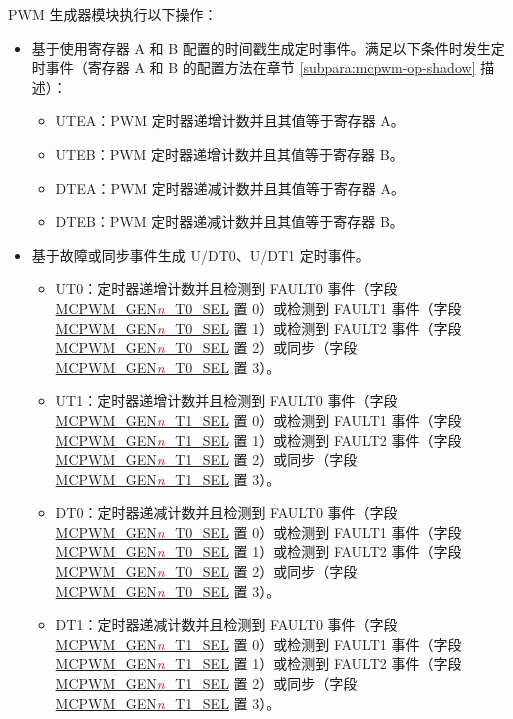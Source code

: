 \documentclass[main\_\_CN.tex]{subfiles}
\begin{document}
PWM 生成器模块执行以下操作：
\begin{itemize}
    \item 基于使用寄存器 A 和 B 配置的时间戳生成定时事件。满足以下条件时发生定时事件（寄存器 A 和 B 的配置方法在章节 \ref{subpara:mcpwm-op-shadow} 描述）：
    \begin{itemize}
        \item UTEA：PWM 定时器递增计数并且其值等于寄存器 A。
        \item UTEB：PWM 定时器递增计数并且其值等于寄存器 B。
        \item DTEA：PWM 定时器递减计数并且其值等于寄存器 A。
        \item DTEB：PWM 定时器递减计数并且其值等于寄存器 B。
    \end{itemize}
    \item 基于故障或同步事件生成 U/DT0、U/DT1 定时事件。
    \begin{itemize}
        \item UT0：定时器递增计数并且检测到 FAULT0 事件（字段 \hyperref[fielddesc:MCPWMGENNT0SEL]{MCPWM\_GEN\textcolor{red}{\it{n}}\_T0\_SEL} 置 0）或检测到 FAULT1 事件（字段 \hyperref[fielddesc:MCPWMGENNT0SEL]{MCPWM\_GEN\textcolor{red}{\it{n}}\_T0\_SEL} 置 1）或检测到 FAULT2 事件（字段 \hyperref[fielddesc:MCPWMGENNT0SEL]{MCPWM\_GEN\textcolor{red}{\it{n}}\_T0\_SEL} 置 2）或同步（字段 \hyperref[fielddesc:MCPWMGENNT0SEL]{MCPWM\_GEN\textcolor{red}{\it{n}}\_T0\_SEL} 置 3）。
        \item UT1：定时器递增计数并且检测到 FAULT0 事件（字段 \hyperref[fielddesc:MCPWMGENNT0SEL]{MCPWM\_GEN\textcolor{red}{\it{n}}\_T1\_SEL} 置 0）或检测到 FAULT1 事件（字段 \hyperref[fielddesc:MCPWMGENNT0SEL]{MCPWM\_GEN\textcolor{red}{\it{n}}\_T1\_SEL} 置 1）或检测到 FAULT2 事件（字段 \hyperref[fielddesc:MCPWMGENNT0SEL]{MCPWM\_GEN\textcolor{red}{\it{n}}\_T1\_SEL} 置 2）或同步（字段 \hyperref[fielddesc:MCPWMGENNT0SEL]{MCPWM\_GEN\textcolor{red}{\it{n}}\_T1\_SEL} 置 3）。
        \item DT0：定时器递减计数并且检测到 FAULT0 事件（字段 \hyperref[fielddesc:MCPWMGENNT0SEL]{MCPWM\_GEN\textcolor{red}{\it{n}}\_T0\_SEL} 置 0）或检测到 FAULT1 事件（字段 \hyperref[fielddesc:MCPWMGENNT0SEL]{MCPWM\_GEN\textcolor{red}{\it{n}}\_T0\_SEL} 置 1）或检测到 FAULT2 事件（字段 \hyperref[fielddesc:MCPWMGENNT0SEL]{MCPWM\_GEN\textcolor{red}{\it{n}}\_T0\_SEL} 置 2）或同步（字段 \hyperref[fielddesc:MCPWMGENNT0SEL]{MCPWM\_GEN\textcolor{red}{\it{n}}\_T0\_SEL} 置 3）。
        \item DT1：定时器递减计数并且检测到 FAULT0 事件（字段 \hyperref[fielddesc:MCPWMGENNT0SEL]{MCPWM\_GEN\textcolor{red}{\it{n}}\_T1\_SEL} 置 0）或检测到 FAULT1 事件（字段 \hyperref[fielddesc:MCPWMGENNT0SEL]{MCPWM\_GEN\textcolor{red}{\it{n}}\_T1\_SEL} 置 1）或检测到 FAULT2 事件（字段 \hyperref[fielddesc:MCPWMGENNT0SEL]{MCPWM\_GEN\textcolor{red}{\it{n}}\_T1\_SEL} 置 2）或同步（字段 \hyperref[fielddesc:MCPWMGENNT0SEL]{MCPWM\_GEN\textcolor{red}{\it{n}}\_T1\_SEL} 置 3）。

\end{itemize}
\end{itemize}
\end{document}

